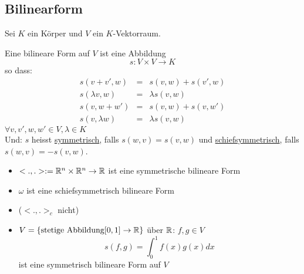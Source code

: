 \subsection{Bilinearform}
Sei $K$ ein Körper und $V$ ein $K$-Vektorraum.
\begin{Def}[Bilinearform]
  Eine bilineare Form auf $V$ ist eine Abbildung
  \[s:V\times V\to K\]
  so dass:
  \begin{align*}
    s(v+v',w)&=&s(v,w)+s(v',w)\\
    s(\lambda v,w)&=&\lambda s(v,w)\\
    s(v,w+w')&=&s(v,w)+s(v,w')\\
    s(v,\lambda w)&=& \lambda s(v,w)
  \end{align*}
  $\forall v,v',w,w'\in V, \lambda \in K$\\
  Und: $s$ heisst \underline{symmetrisch}, falls $s(w,v)=s(v,w)$ und \underline{schiefsymmetrisch}, falls $s(w,v)=-s(v,w)$.
\end{Def}
\begin{Bsp}
  \begin{itemize}
    \item $<.,.>:=\mathbb{R}^n\times \mathbb{R}^n\to\mathbb{R}$ ist eine symmetrische bilineare Form
    \item $\omega$ ist eine schiefsymmetrisch bilineare Form
    \item ($<.,.>_c$ nicht)
    \item $V=\{\text{stetige Abbildung} [0,1] \to\mathbb{R}\}$ über $\mathbb{R}$: $f,g\in V$
      \[s(f,g)=\int^1_0 f(x)g(x)dx\]
      ist eine symmetrisch bilineare Form auf $V$
  \end{itemize}
\end{Bsp}
